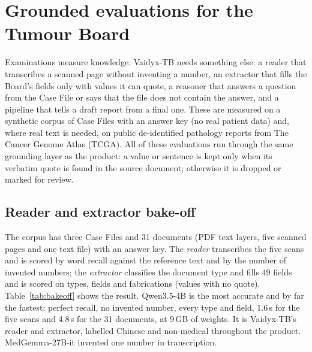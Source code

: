 \documentclass{article}
\newcommand{\fit}[1]{\adjustbox{max width=\textwidth}{#1}}
\begin{document}
\section{Grounded evaluations for the Tumour Board}
\label{sec:grounded}

Examinations measure knowledge. Vaidyx-TB needs something else: a reader that transcribes a scanned page without inventing a number, an extractor that fills the Board's fields only with values it can quote, a reasoner that answers a question from the Case File or says that the file does not contain the answer, and a pipeline that tells a draft report from a final one. These are measured on a synthetic corpus of Case Files with an answer key (no real patient data) and, where real text is needed, on public de-identified pathology reports from The Cancer Genome Atlas (TCGA). All of these evaluations run through the same grounding layer as the product: a value or sentence is kept only when its verbatim quote is found in the source document; otherwise it is dropped or marked for review.

\subsection{Reader and extractor bake-off}

The corpus has three Case Files and 31 documents (PDF text layers, five scanned pages and one text file) with an answer key. The \emph{reader} transcribes the five scans and is scored by word recall against the reference text and by the number of invented numbers; the \emph{extractor} classifies the document type and fills 49 fields and is scored on types, fields and fabrications (values with no quote). Table~\ref{tab:bakeoff} shows the result. Qwen3.5-4B is the most accurate and by far the fastest: perfect recall, no invented number, every type and field, 1.6\,s for the five scans and 4.8\,s for the 31 documents, at 9\,GB of weights. It is Vaidyx-TB's reader and extractor, labelled Chinese and non-medical throughout the product. MedGemma-27B-it invented one number in transcription.

\begin{table}[htbp]
\centering\footnotesize\setlength{\tabcolsep}{4pt}
\caption{Reader and extractor bake-off on the synthetic corpus (3 Case Files, 31 documents, 5 scans). Fabricated = extracted values with no verbatim quote. Times on the H200 at 300\,W.}
\label{tab:bakeoff}
\fit{}
\end{table}
\end{document}
